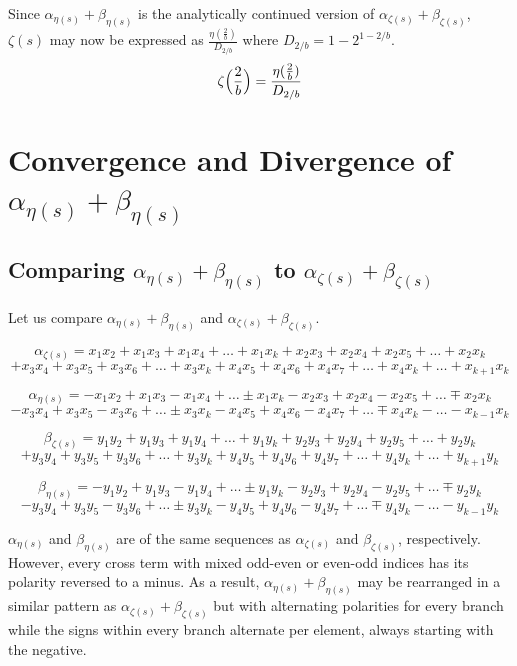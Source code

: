 \documentclass{amsart}
\begin{document}
	Since $\alpha_{\eta(s)} + \beta_{\eta(s)}$ is the analytically continued version of $\alpha_{\zeta(s)} + \beta_{\zeta(s)}$, $\zeta(s)$ may now be expressed as $\frac{\eta( \frac{2}{b} )}{D_{2/b}}$ where $D_{2/b} = 1 - 2^{1-{2/b}}$.
	\[ \zeta\Bigl( \frac{2}{b} \Bigr) = \frac{\eta( \frac{2}{b} )}{D_{2/b}} \]
	
	\section{Convergence and Divergence of $\alpha_{\eta(s)} + \beta_{\eta(s)}$}
	\subsection{Comparing $\alpha_{\eta(s)} + \beta_{\eta(s)}$ to $\alpha_{\zeta(s)} + \beta_{\zeta(s)}$}
	Let us compare $\alpha_{\eta(s)} + \beta_{\eta(s)}$ and $\alpha_{\zeta(s)} + \beta_{\zeta(s)}$.
	
	\[ \alpha_{\zeta(s)} = x_1x_2 + x_1x_3 + x_1x_4 + \dots + x_{1}x_{k} +x_2x_3 + x_2x_4 + x_2x_5 + \dots + x_{2}x_{k} \]
	\[ +x_3x_4 + x_3x_5 + x_3x_6 + \dots + x_{3}x_{k} +x_4x_5 + x_4x_6 + x_4x_7 + \dots + x_{4}x_{k} + \dots + x_{k+1}x_{k} \]
	
	\[ \alpha_{\eta(s)} = -x_1x_2 + x_1x_3 - x_1x_4 + \dots \pm x_{1}x_{k} -x_2x_3 + x_2x_4 - x_2x_5 + \dots \mp x_{2}x_{k} \]
	\[ -x_3x_4 + x_3x_5 - x_3x_6 + \dots \pm x_{3}x_{k} -x_4x_5 + x_4x_6 - x_4x_7 + \dots \mp x_{4}x_{k} - \dots - x_{k-1}x_{k} \]
	
	\[ \beta_{\zeta(s)} = y_1y_2 + y_1y_3 + y_1y_4 + \dots + y_{1}y_{k} +y_2y_3 + y_2y_4 + y_2y_5 + \dots + y_{2}y_{k} \]
	\[ +y_3y_4 + y_3y_5 + y_3y_6 + \dots + y_{3}y_{k} +y_4y_5 + y_4y_6 + y_4y_7 + \dots + y_{4}y_{k} + \dots + y_{k+1}y_{k} \]
	
	\[ \beta_{\eta(s)} = -y_1y_2 + y_1y_3 - y_1y_4 + \dots \pm y_{1}y_{k} -y_2y_3 + y_2y_4 - y_2y_5 + \dots \mp y_{2}y_{k} \]
	\[ -y_3y_4 + y_3y_5 - y_3y_6 + \dots \pm y_{3}y_{k} -y_4y_5 + y_4y_6 - y_4y_7 + \dots \mp y_{4}y_{k} - \dots - y_{k-1}y_{k} \]
	\[\]
	
	$\alpha_{\eta(s)}$ and $\beta_{\eta(s)}$ are of the same sequences as $\alpha_{\zeta(s)}$ and $\beta_{\zeta(s)}$, respectively. However, every cross term with mixed odd-even or even-odd indices has its polarity reversed to a minus. As a result, $\alpha_{\eta(s)} + \beta_{\eta(s)}$ may be rearranged in a similar pattern as $\alpha_{\zeta(s)} + \beta_{\zeta(s)}$ but with alternating polarities for every branch while the signs within every branch alternate per element, always starting with the negative.
	
\end{document}
